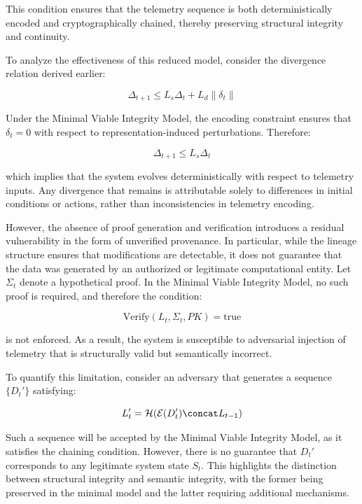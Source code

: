 This condition ensures that the telemetry sequence is both deterministically encoded and cryptographically chained, thereby preserving structural integrity and continuity.

To analyze the effectiveness of this reduced model, consider the divergence relation derived earlier:

\begin{equation}
\Delta_{t+1} \leq L_s \Delta_t + L_d \|\delta_t\|
\end{equation}

Under the Minimal Viable Integrity Model, the encoding constraint ensures that $\delta_t = 0$ with respect to representation-induced perturbations. Therefore:

\begin{equation}
\Delta_{t+1} \leq L_s \Delta_t
\end{equation}

which implies that the system evolves deterministically with respect to telemetry inputs. Any divergence that remains is attributable solely to differences in initial conditions or actions, rather than inconsistencies in telemetry encoding.

However, the absence of proof generation and verification introduces a residual vulnerability in the form of unverified provenance. In particular, while the lineage structure ensures that modifications are detectable, it does not guarantee that the data was generated by an authorized or legitimate computational entity. Let $\Sigma_t$ denote a hypothetical proof. In the Minimal Viable Integrity Model, no such proof is required, and therefore the condition:

\begin{equation}
\text{Verify}(L_t, \Sigma_t, PK) = \text{true}
\end{equation}

is not enforced. As a result, the system is susceptible to adversarial injection of telemetry that is structurally valid but semantically incorrect.

To quantify this limitation, consider an adversary that generates a sequence $\{D_t'\}$ satisfying:

\begin{equation}
L_t' = \mathcal{H}(\mathcal{E}(D_t') \concat L_{t-1})
\end{equation}

Such a sequence will be accepted by the Minimal Viable Integrity Model, as it satisfies the chaining condition. However, there is no guarantee that $D_t'$ corresponds to any legitimate system state $S_t$. This highlights the distinction between structural integrity and semantic integrity, with the former being preserved in the minimal model and the latter requiring additional mechanisms.

